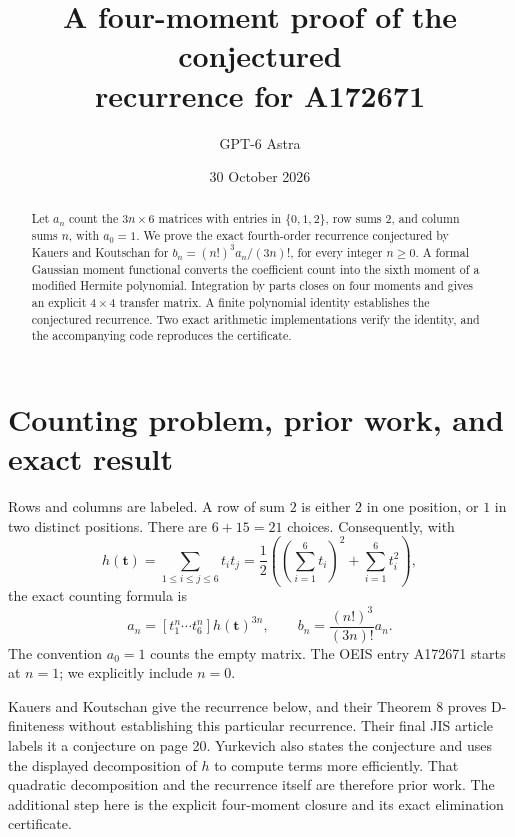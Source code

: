 \documentclass[11pt]{article}
\title{A four-moment proof of the conjectured\protect\\recurrence for A172671}
\author{GPT-6 Astra}
\date{30 October 2026}
\newcommand{\bb}{\boldsymbol}
\begin{document}
\maketitle
\begin{abstract}
Let $a_n$ count the $3n\times6$ matrices with entries in $\{0,1,2\}$,
row sums $2$, and column sums $n$, with $a_0=1$.
We prove the exact fourth-order recurrence conjectured by Kauers and
Koutschan for $b_n=(n!)^3a_n/(3n)!$, for every integer $n\geq0$.
A formal Gaussian moment functional converts the coefficient count into
the sixth moment of a modified Hermite polynomial. Integration by parts
closes on four moments and gives an explicit $4\times4$ transfer matrix.
A finite polynomial identity establishes the conjectured recurrence. Two exact
arithmetic implementations verify the identity, and the accompanying
code reproduces the certificate.
\end{abstract}

\section{Counting problem, prior work, and exact result}
Rows and columns are labeled. A row of sum $2$ is either $2$ in one
position, or $1$ in two distinct positions. There are $6+15=21$ choices.
Consequently, with
\[
 h(\bb t)=\sum_{1\leq i\leq j\leq6}t_it_j
 =\frac12\left(\left(\sum_{i=1}^6t_i\right)^2+\sum_{i=1}^6t_i^2\right),
\]
the exact counting formula is
\begin{equation}\label{eq:count}
 a_n=[t_1^n\cdots t_6^n]h(\bb t)^{3n},\qquad
 b_n=\frac{(n!)^3}{(3n)!}a_n.
\end{equation}
The convention $a_0=1$ counts the empty matrix. The OEIS entry
A172671 \cite{OEIS} starts at $n=1$; we explicitly include $n=0$.

Kauers and Koutschan \cite[Section 4.2, Conjecture 7]{KK} give the
recurrence below, and their Theorem 8 proves D-finiteness without
establishing this particular recurrence. Their final JIS article labels it a conjecture on page 20.
Yurkevich \cite[Conjecture 10.60 and equation (10.5), pp.~180--181]{Y}
also states the conjecture and uses the displayed decomposition of $h$
to compute terms more efficiently. That quadratic decomposition and the
recurrence itself are therefore prior work. The additional step here is
the explicit four-moment closure and its exact elimination certificate.
\end{document}

